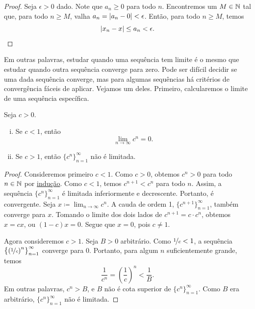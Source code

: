 \begin{proof}
Seja $\epsilon > 0$ dado. Note que $a_n \geq 0$
para todo $n$. Encontremos um $M \in {\mathbb{N}}$ tal que, para
todo $n \geq M$, valha
$a_n = \lvert {a_n - 0} \rvert < \epsilon$. Então, para todo $n \geq M$,
temos
\begin{equation*}
\lvert {x_n - x} \rvert \leq a_n < \epsilon . \qedhere
\end{equation*}
\end{proof}

Em outras palavras, estudar quando uma sequência tem limite é
o mesmo que estudar quando outra sequência converge para zero.
Pode ser difícil decidir se uma dada sequência converge, mas
para algumas sequências há critérios de convergência fáceis de aplicar.
Vejamos um deles.
Primeiro, calcularemos o limite de uma sequência específica.

\begin{prop}
Seja $c > 0$.
\begin{enumerate}[(i)]
\item
Se $c < 1$, então
\begin{equation*}
\lim_{n\to\infty} c^n = 0.
\end{equation*}
\item
Se $c > 1$, então $\{ c^n \}_{n=1}^\infty$ não é limitada.
\end{enumerate}
\end{prop}

\begin{proof}
Consideremos primeiro $c < 1$. Como $c > 0$, obtemos $c^n > 0$ para todo $n \in {\mathbb{N}}$ por
\hyperref[induction:thm]{indução}. Como $c < 1$, temos
$c^{n+1} < c^n$ para todo $n$.
Assim, a sequência $\{ c^n \}_{n=1}^\infty$ é
limitada inferiormente e
decrescente. Portanto, é convergente.
Seja $x \coloneqq \lim_{n\to\infty} c^n$. A cauda de ordem 1, $\{ c^{n+1} \}_{n=1}^\infty$,
também converge para $x$. Tomando o limite dos dois lados de $c^{n+1} = c \cdot
c^n$, obtemos $x = cx$, ou $(1-c)x=0$. Segue que $x=0$, pois $c \neq 1$.

Agora consideremos $c > 1$.
Seja $B > 0$ arbitrário.
Como $\nicefrac{1}{c} < 1$, a sequência $\bigl\{ {(\nicefrac{1}{c})}^n \bigr\}_{n=1}^\infty$
converge para $0$.
Portanto, para algum $n$ suficientemente grande, temos
\begin{equation*}
\frac{1}{c^n} =
{\left(\frac{1}{c}\right)}^n < \frac{1}{B} .
\end{equation*}
Em outras palavras, $c^n > B$, e $B$ não é cota superior de
$\{ c^n \}_{n=1}^\infty$. Como $B$ era arbitrário, $\{ c^n \}_{n=1}^\infty$ não é limitada.
\end{proof}

